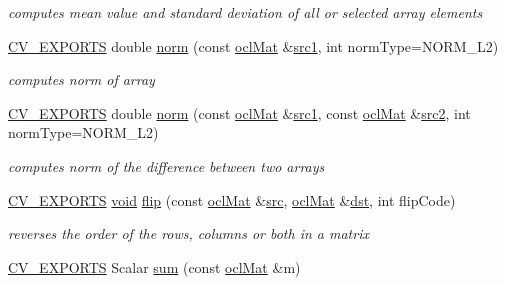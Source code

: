 \begin{DoxyCompactItemize}
\begin{DoxyCompactList}\small\item\em computes mean value and standard deviation of all or selected array elements \end{DoxyCompactList}\item 
\hyperlink{core_2types__c_8h_a1bf9f0e121b54272da02379cfccd0a2b}{C\-V\-\_\-\-E\-X\-P\-O\-R\-T\-S} double \hyperlink{namespacecv_1_1ocl_a3f4937f7257ac5ebce3feff0dffcbde1}{norm} (const \hyperlink{classcv_1_1ocl_1_1oclMat}{ocl\-Mat} \&\hyperlink{core__c_8h_a897de4702c922f4cccda0d57ccdcafb3}{src1}, int norm\-Type=N\-O\-R\-M\-\_\-\-L2)
\begin{DoxyCompactList}\small\item\em computes norm of array \end{DoxyCompactList}\item 
\hyperlink{core_2types__c_8h_a1bf9f0e121b54272da02379cfccd0a2b}{C\-V\-\_\-\-E\-X\-P\-O\-R\-T\-S} double \hyperlink{namespacecv_1_1ocl_ace172a8ffe8d232a5dcdffbd2fb89d10}{norm} (const \hyperlink{classcv_1_1ocl_1_1oclMat}{ocl\-Mat} \&\hyperlink{core__c_8h_a897de4702c922f4cccda0d57ccdcafb3}{src1}, const \hyperlink{classcv_1_1ocl_1_1oclMat}{ocl\-Mat} \&\hyperlink{core__c_8h_a7561a36d48069d54a6c8ac4e4750edfd}{src2}, int norm\-Type=N\-O\-R\-M\-\_\-\-L2)
\begin{DoxyCompactList}\small\item\em computes norm of the difference between two arrays \end{DoxyCompactList}\item 
\hyperlink{core_2types__c_8h_a1bf9f0e121b54272da02379cfccd0a2b}{C\-V\-\_\-\-E\-X\-P\-O\-R\-T\-S} \hyperlink{legacy_8hpp_a8bb47f092d473522721002c86c13b94e}{void} \hyperlink{namespacecv_1_1ocl_af80a71478552821694576cb68947aa56}{flip} (const \hyperlink{classcv_1_1ocl_1_1oclMat}{ocl\-Mat} \&\hyperlink{legacy_8hpp_a371cd109b74033bc4366f584edd3dacc}{src}, \hyperlink{classcv_1_1ocl_1_1oclMat}{ocl\-Mat} \&\hyperlink{photo__c_8h_aed13e2a25279b24dc954073233fef7a5}{dst}, int flip\-Code)
\begin{DoxyCompactList}\small\item\em reverses the order of the rows, columns or both in a matrix \end{DoxyCompactList}\item 
\hyperlink{core_2types__c_8h_a1bf9f0e121b54272da02379cfccd0a2b}{C\-V\-\_\-\-E\-X\-P\-O\-R\-T\-S} Scalar \hyperlink{namespacecv_1_1ocl_ac67634e76808649b1d6d569a1f2ef0ed}{sum} (const \hyperlink{classcv_1_1ocl_1_1oclMat}{ocl\-Mat} \&m)

\end{DoxyCompactItemize}
